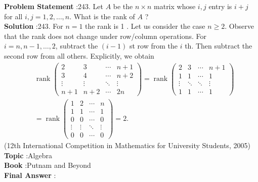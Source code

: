 \documentclass[10pt]{article}
\begin{document}
\textbf{Problem Statement} :243. Let $A$ be the $n \times n$ matrix whose $i, j$ entry is $i+j$ for all $i, j=1,2, \ldots, n$. What is the rank of $A$ ?\\
\textbf{Solution} :243. For $n=1$ the rank is 1 . Let us consider the case $n \geq 2$. Observe that the rank does not change under row/column operations. For $i=n, n-1, \ldots, 2$, subtract the $(i-1)$ st row from the $i$ th. Then subtract the second row from all others. Explicitly, we obtain $$ \begin{aligned} & \operatorname{rank}\left(\begin{array}{cccc}2 & 3 & \cdots & n+1 \\3 & 4 & \cdots & n+2 \\\vdots & \vdots & \ddots & \vdots \\n+1 & n+2 & \cdots & 2 n\end{array}\right)=\operatorname{rank}\left(\begin{array}{cccc}2 & 3 & \cdots & n+1 \\1 & 1 & \cdots & 1 \\\vdots & \ddots & \ddots & \vdots \\1 & 1 & \cdots & 1\end{array}\right) \\ & =\operatorname{rank}\left(\begin{array}{cccc}1 & 2 & \cdots & n \\1 & 1 & \cdots & 1 \\0 & 0 & \cdots & 0 \\\vdots & \vdots & \ddots & \vdots \\0 & 0 & \cdots & 0\end{array}\right)=2 \text {. } \end{aligned} $$(12th International Competition in Mathematics for University Students, 2005)\\
\textbf{Topic} :Algebra\\
\textbf{Book} :Putnam and Beyond\\
\textbf{Final Answer} :\\
\end{document}
